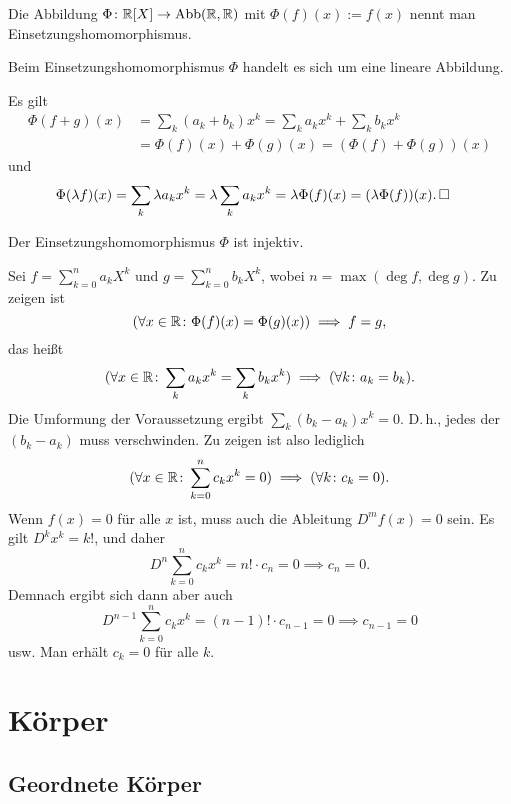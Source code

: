 \begin{Definition}[Einsetzungshomomorphismus]\newlinefirst
Die Abbildung $\Phi\colon\mathbb R[X]\to\operatorname{Abb}(\mathbb R,\mathbb R)$ mit $\Phi(f)(x):=f(x)$
nennt man Einsetzungshomomorphismus.
\end{Definition}

\begin{Satz}
Beim Einsetzungshomomorphismus $\Phi$ handelt es sich um eine lineare
Abbildung.
\end{Satz}
\begin{Beweis}
Es gilt
\begin{align*}
\Phi(f+g)(x) &= \sum_k (a_k + b_k) x^k = \sum_k a_k x^k + \sum_k b_k x^k\\
&= \Phi(f)(x) + \Phi(g)(x) = (\Phi(f)+\Phi(g))(x)
\end{align*}
und
\begin{align*}
\Phi(\lambda f)(x) &= \sum_k \lambda a_k x^k = \lambda\sum_k a_k x^k
= \lambda\Phi(f)(x) = (\lambda\Phi(f))(x).\,\square
\end{align*}
\end{Beweis}

\newpage
\begin{Satz}
Der Einsetzungshomomorphismus $\Phi$ ist injektiv.
\end{Satz}
\begin{Beweis}
Sei $f=\sum_{k=0}^n a_k X^k$
und $g=\sum_{k=0}^n b_k X^k$, wobei $n=\max(\deg f,\deg g)$.
Zu zeigen ist
\[(\forall x\in\mathbb R\colon \Phi(f)(x)=\Phi(g)(x))\implies f=g,\]
das heißt
\[(\forall x\in\mathbb R\colon \sum_k a_k x^k = \sum_k b_k x^k)\implies (\forall k\colon a_k=b_k).\]
Die Umformung der Voraussetzung ergibt $\sum_k (b_k-a_k)x^k = 0$.
D.\,h., jedes der $(b_k-a_k)$ muss verschwinden. Zu zeigen ist also
lediglich
\[(\forall x\in\mathbb R\colon \sum_{k=0}^n c_k x^k = 0)\implies (\forall k\colon c_k=0).\]
Wenn $f(x)=0$ für alle $x$ ist, muss auch die Ableitung $D^m f(x)=0$
sein. Es gilt $D^k x^k = k!$, und daher
\[D^n\sum_{k=0}^n c_k x^k = n!\cdot c_n = 0 \implies c_n=0.\]
Demnach ergibt sich dann aber auch
\[D^{n-1}\sum_{k=0}^n c_k x^k = (n-1)!\cdot c_{n-1} = 0\implies c_{n-1}=0\]
usw. Man erhält $c_k=0$ für alle $k$.\;\qedsymbol
\end{Beweis}

\section{Körper}

\subsection{Geordnete Körper}

